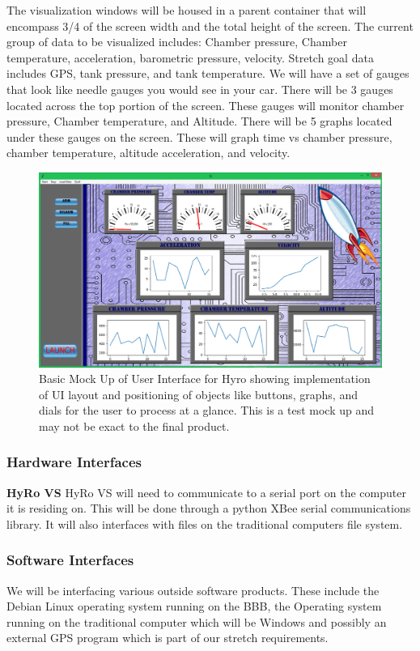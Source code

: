 \documentclass[10pt,draftclsnofoot,onecolumn,compsoc]{IEEEtran}
\begin{document}
 
The visualization windows will be housed in a parent container that will encompass 3/4 of the screen width and the total height of the screen. The current group of data to be visualized includes: Chamber pressure, Chamber temperature, acceleration, barometric pressure, velocity. Stretch goal data includes GPS, tank pressure, and tank temperature. We will have a set of gauges that look like needle gauges you would see in your car. There will be 3 gauges located across the top portion of the screen. These gauges will monitor chamber pressure, Chamber temperature, and Altitude. There will be 5 graphs located under these gauges on the screen. These will graph time vs chamber pressure, chamber temperature, altitude acceleration, and velocity.\par


\begin{figure}
  \caption{Basic Mock Up of User Interface for Hyro showing implementation of UI layout and positioning of objects like buttons, graphs, and dials for the user to process at a glance. This is a test mock up and may not be exact to the final product. }
  \centering
	\includegraphics[scale=.45]{HyroGui}
\end{figure}
\FloatBarrier
\subsubsection{Hardware Interfaces}

{\bf HyRo VS}
HyRo VS will need to communicate to a serial port on the computer it is residing on.  This will be done through a python XBee serial communications library. It will also interfaces with files on the traditional computers file system.

\subsubsection{Software Interfaces}
	We will be interfacing various outside software products. These include the Debian Linux operating system running on the BBB, the Operating system running on the traditional computer which will be Windows and possibly an external GPS program which is part of our stretch requirements.
\end{document}

